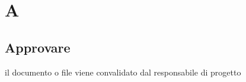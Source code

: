 \section{A}
\subsection{Approvare}%
il documento o file viene convalidato dal responsabile di progetto
\clearpage 